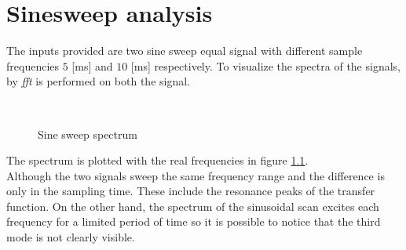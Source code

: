 \chapter{Sinesweep analysis}
\label{chap:sinesweep}
The inputs provided are two sine sweep equal signal with different sample
frequencies \(5\) [\si{\milli\second}] and \(10\) [\si{\milli\second}] 
respectively.
To visualize the spectra of the signals, by \emph{fft} is performed on both the
signal.
\begin{figure}[htb]
	\centering
		\,
	\caption{Sine sweep spectrum}
	\label{fig:spectral}
\end{figure}
%
The spectrum is plotted with the real frequencies in figure \ref{fig:spectral}.\\
Although the two signals sweep the same frequency range and the difference is
only in the sampling time. These include the resonance peaks of the transfer
function.
On the other hand, the spectrum of the sinusoidal scan excites each frequency
for a limited period of time so it is possible to notice that the third mode is
not clearly visible.
%
